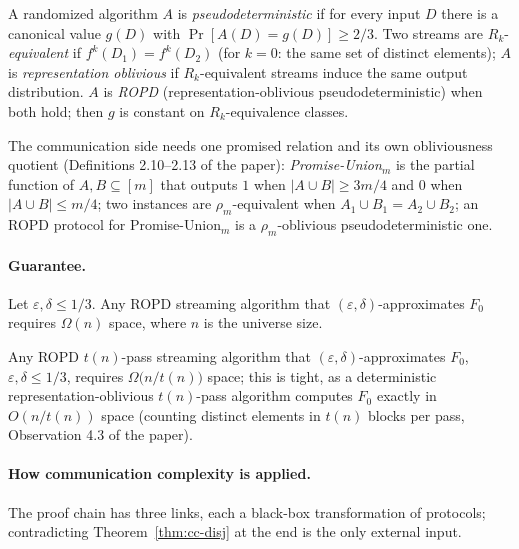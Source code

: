 \begin{definition}\label{def:cc-ropd}
A randomized algorithm $A$ is \emph{pseudodeterministic} if for every input $D$ there
is a canonical value $g(D)$ with $\Pr[A(D) = g(D)] \ge 2/3$. Two streams are
$R_k$-\emph{equivalent} if $f^k(D_1) = f^k(D_2)$ (for $k = 0$: the same set of
distinct elements); $A$ is \emph{representation oblivious} if $R_k$-equivalent
streams induce the same output distribution. $A$ is \emph{ROPD}
(representation-oblivious pseudodeterministic) when both hold; then $g$ is constant
on $R_k$-equivalence classes.
\end{definition}

The communication side needs one promised relation and its own obliviousness
quotient (Definitions 2.10--2.13 of the paper): \emph{Promise-Union}$_m$ is the
partial function of $A, B \subseteq [m]$ that outputs $1$ when $|A \cup B| \ge 3m/4$
and $0$ when $|A \cup B| \le m/4$; two instances are $\rho_m$-equivalent when
$A_1 \cup B_1 = A_2 \cup B_2$; an ROPD protocol for Promise-Union$_m$ is a
$\rho_m$-oblivious pseudodeterministic one.

\paragraph{Guarantee.}

\begin{theorem}\label{thm:cc-ropd-lb}
Let $\varepsilon, \delta \le 1/3$. Any ROPD streaming algorithm that
$(\varepsilon,\delta)$-approximates $F_0$ requires $\Omega(n)$ space, where $n$ is
the universe size. \eop
\end{theorem}

\begin{corollary}\label{cor:cc-ropd-mp}
Any ROPD $t(n)$-pass streaming algorithm that $(\varepsilon,\delta)$-approximates
$F_0$, $\varepsilon, \delta \le 1/3$, requires $\Omega\bigl(n/t(n)\bigr)$ space; this
is tight, as a deterministic representation-oblivious $t(n)$-pass algorithm computes
$F_0$ exactly in $O(n/t(n))$ space (counting distinct elements in $t(n)$ blocks per
pass, Observation 4.3 of the paper). \eop
\end{corollary}

\paragraph{How communication complexity is applied.}
The proof chain has three links, each a black-box transformation of protocols;
contradicting Theorem~\ref{thm:cc-disj} at the end is the only external input.

